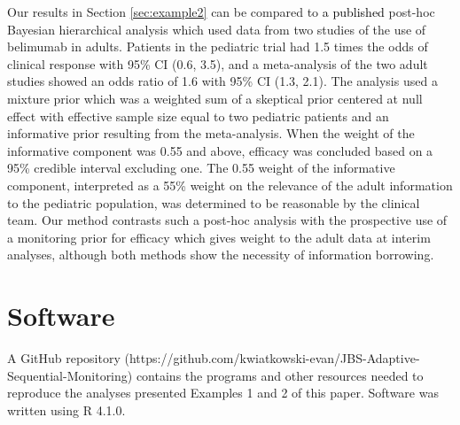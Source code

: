 \documentclass[12pt]{article}
\begin{document}
Our results in Section \ref{sec:example2} can be compared to \textcolor{black}{a published} post-hoc Bayesian hierarchical analysis \citep{Brunner2020} which used data from two studies of the use of belimumab in adults. Patients in the pediatric trial had 1.5 times the odds of clinical response with 95\% CI (0.6, 3.5), and a meta-analysis of the two adult studies showed an odds ratio of 1.6 with 95\% CI (1.3, 2.1). The analysis used a mixture prior which was a weighted sum of a skeptical prior centered at null effect with effective sample size equal to two pediatric patients and an informative prior resulting from the meta-analysis. When the weight of the informative component was 0.55 and above, efficacy was concluded based on a 95\% credible interval excluding one. The 0.55 weight of the informative component, interpreted as a 55\% weight on the relevance of the adult information to the pediatric population, was determined to be reasonable by the clinical team. Our method contrasts such a post-hoc analysis with the prospective use of a monitoring prior for efficacy which gives weight to the adult data at interim analyses, although both methods show the necessity of information borrowing. %

%


\section*{Software} \label{s:Software}
A GitHub repository (https://github.com/kwiatkowski-evan/JBS-Adaptive-Sequential-Monitoring) contains the programs and other resources 
needed to reproduce the analyses presented Examples 1 and 2 of this paper. Software was written using R 4.1.0.
\end{document}
